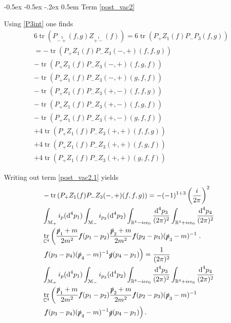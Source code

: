 \documentclass[oneside,reqno,12pt]{amsart}
\makeatletter
\DeclareMathOperator{\tr}{tr}
\newcommand{\Z}[2]{Z_{\stackrel{1}{#1}}\left(#2\right)}
\renewcommand\subsection{\@startsection {subsection}{1}{\z@}%
                                   {-0.5ex \@plus -0.5ex \@minus -.2ex}%
                                   {0.5em}%
                                   {\normalfont\bfseries}}
\makeatother
\begin{document}
\subsection{Term \eqref{post_vac2}}

Using \eqref{P3int} one finds
\begin{align}\tag*{}
&6 \tr\left(  P_{\stackrel{3}{-+}}(f,g) \Z{+-}{f}\right)=
6 \tr\left(P_+Z_1(f) P_-  P_{3} (f,g) \right)\\\label{post_vac2.1}
&=- \tr\left(P_+ Z_1(f)P_- Z_3(-,+)(f,f,g)\right)\\\label{post_vac2.2}
&- \tr\left(P_+ Z_1(f)P_- Z_3(-,+)(f,g,f)\right)\\\label{post_vac2.3}
&- \tr\left(P_+ Z_1(f)P_- Z_3(-,+)(g,f,f)\right)\\\label{post_vac2.4}
&- \tr\left(P_+ Z_1(f)P_- Z_3(+,-)(f,f,g)\right)\\\label{post_vac2.5}
&- \tr\left(P_+ Z_1(f)P_- Z_3(+,-)(f,g,f)\right)\\\label{post_vac2.6}
&- \tr\left(P_+ Z_1(f)P_- Z_3(+,-)(g,f,f)\right)\\\label{post_vac2.7}
&+4 \tr\left(P_+ Z_1(f)P_- Z_3(+,+)(f,f,g)\right)\\\label{post_vac2.8}
&+4 \tr\left(P_+ Z_1(f)P_-  Z_3(+,+)(f,g,f)\right)\\\label{post_vac2.9}
&+4 \tr\left(P_+ Z_1(f)P_-  Z_3(+,+)(g,f,f)\right)
\end{align}

Writing out term \eqref{post_vac2.1} yields
\begin{align*}
&- \tr\left(P_+ Z_1(f)P_- Z_3(-,+)(f,f,g)\right)
=-(-1)^{1+3}\left(\frac{i}{2\pi}\right)^2\\
&\int_{\mathcal{M_+}}  i_p(\text{d}^4p_{1}) 
\int_{\mathcal{M_-}}  i_{p_2}(\text{d}^4p_{2})
\int_{\mathbb{R}^4-i \epsilon e_0}\frac{\text{d}^4p_3}{(2\pi)^{2}}
\int_{\mathbb{R}^4+i \epsilon e_0}\frac{\text{d}^4p_4}{(2\pi)^{2}}
 \\
&\tr_{\mathbb{C}^4}\left(\frac{\slashed{p}_1+m}{2m^2} \slashed{f}(p_{1}-p_{2})
 \frac{\slashed{p}_{2}+m}{2m^2} 
   \slashed{f}(p_{2}-p_3)  (\slashed{p}_3-m)^{-1} \right..
\\
&\left. \slashed{f}(p_{3}-p_4)  (\slashed{p}_4-m)^{-1} \slashed{g}(p_{4}-p_{1})\right)
=\frac{1}{(2\pi)^2}\\
&\int_{\mathcal{M_+}}  i_p(\text{d}^4p_{1}) 
\int_{\mathcal{M_-}}  i_{p_2}(\text{d}^4p_{2})
\int_{\mathbb{R}^4-i \epsilon e_0}\frac{\text{d}^4p_3}{(2\pi)^{2}}
\int_{\mathbb{R}^4+i \epsilon e_0}\frac{\text{d}^4p_4}{(2\pi)^{2}}
 \\
&\tr_{\mathbb{C}^4}\left(\frac{\slashed{p}_1+m}{2m^2} \slashed{f}(p_{1}-p_{2})
 \frac{\slashed{p}_{2}+m}{2m^2} 
   \slashed{f}(p_{2}-p_3)  (\slashed{p}_3-m)^{-1} \right.
\\
&\left. \slashed{f}(p_{3}-p_4)  (\slashed{p}_4-m)^{-1} \slashed{g}(p_{4}-p_{1})\right)
.\end{align*}
\end{document}
